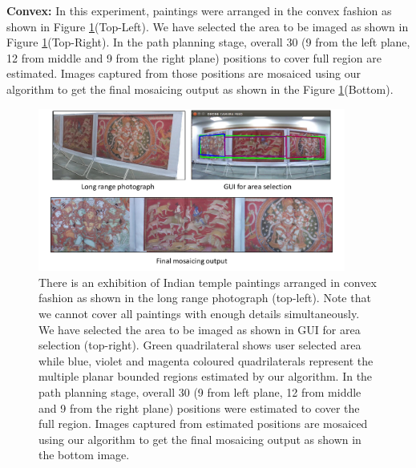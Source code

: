 \textbf{Convex:} In this experiment, paintings were arranged in the convex
fashion as shown in Figure \ref{fig:resultConvex}(Top-Left). We have selected
the area to be imaged as shown in Figure \ref{fig:resultConvex}(Top-Right). In
the path planning stage, overall 30 (9 from the left plane, 12 from middle and 9
from the right plane) positions to cover full region are estimated.  Images
captured from those positions are mosaiced using our algorithm to get the final
mosaicing output as shown in the Figure \ref{fig:resultConvex}(Bottom).
\begin{figure}
\centering
\includegraphics[width=0.9\textwidth]{figures/multiplanar/convexResult.pdf}
\caption[Result: Convex arrangement]{There is an exhibition of Indian temple
paintings arranged in convex fashion as shown in the long range photograph (top-left). Note that we
cannot cover all paintings with enough details simultaneously. We have selected
the area to be imaged as shown in GUI for area selection (top-right).
Green quadrilateral shows user selected area while blue, violet and magenta
coloured quadrilaterals represent the multiple planar bounded regions
estimated by our algorithm. In the path planning stage, overall 30 (9 from left
plane, 12 from middle and 9 from the right plane) positions were estimated to cover
the full region. Images captured from estimated positions are mosaiced using our
algorithm to get the final mosaicing output as shown in the bottom image.}
\label{fig:resultConvex}
\end{figure}

